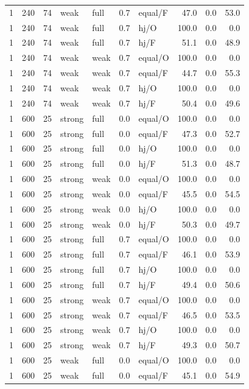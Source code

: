 {\begin{longtable}{@{}rrrllllrrr@{}}
1 & 240 & 74 & weak & full & 0.7 & equal/F & 47.0 & 0.0 & 53.0\\
1 & 240 & 74 & weak & full & 0.7 & hj/O & 100.0 & 0.0 & 0.0\\
1 & 240 & 74 & weak & full & 0.7 & hj/F & 51.1 & 0.0 & 48.9\\
1 & 240 & 74 & weak & weak & 0.7 & equal/O & 100.0 & 0.0 & 0.0\\
1 & 240 & 74 & weak & weak & 0.7 & equal/F & 44.7 & 0.0 & 55.3\\
1 & 240 & 74 & weak & weak & 0.7 & hj/O & 100.0 & 0.0 & 0.0\\
1 & 240 & 74 & weak & weak & 0.7 & hj/F & 50.4 & 0.0 & 49.6\\
1 & 600 & 25 & strong & full & 0.0 & equal/O & 100.0 & 0.0 & 0.0\\
1 & 600 & 25 & strong & full & 0.0 & equal/F & 47.3 & 0.0 & 52.7\\
1 & 600 & 25 & strong & full & 0.0 & hj/O & 100.0 & 0.0 & 0.0\\
1 & 600 & 25 & strong & full & 0.0 & hj/F & 51.3 & 0.0 & 48.7\\
1 & 600 & 25 & strong & weak & 0.0 & equal/O & 100.0 & 0.0 & 0.0\\
1 & 600 & 25 & strong & weak & 0.0 & equal/F & 45.5 & 0.0 & 54.5\\
1 & 600 & 25 & strong & weak & 0.0 & hj/O & 100.0 & 0.0 & 0.0\\
1 & 600 & 25 & strong & weak & 0.0 & hj/F & 50.3 & 0.0 & 49.7\\
1 & 600 & 25 & strong & full & 0.7 & equal/O & 100.0 & 0.0 & 0.0\\
1 & 600 & 25 & strong & full & 0.7 & equal/F & 46.1 & 0.0 & 53.9\\
1 & 600 & 25 & strong & full & 0.7 & hj/O & 100.0 & 0.0 & 0.0\\
1 & 600 & 25 & strong & full & 0.7 & hj/F & 49.4 & 0.0 & 50.6\\
1 & 600 & 25 & strong & weak & 0.7 & equal/O & 100.0 & 0.0 & 0.0\\
1 & 600 & 25 & strong & weak & 0.7 & equal/F & 46.5 & 0.0 & 53.5\\
1 & 600 & 25 & strong & weak & 0.7 & hj/O & 100.0 & 0.0 & 0.0\\
1 & 600 & 25 & strong & weak & 0.7 & hj/F & 49.3 & 0.0 & 50.7\\
1 & 600 & 25 & weak & full & 0.0 & equal/O & 100.0 & 0.0 & 0.0\\
1 & 600 & 25 & weak & full & 0.0 & equal/F & 45.1 & 0.0 & 54.9\\

\end{longtable}}
